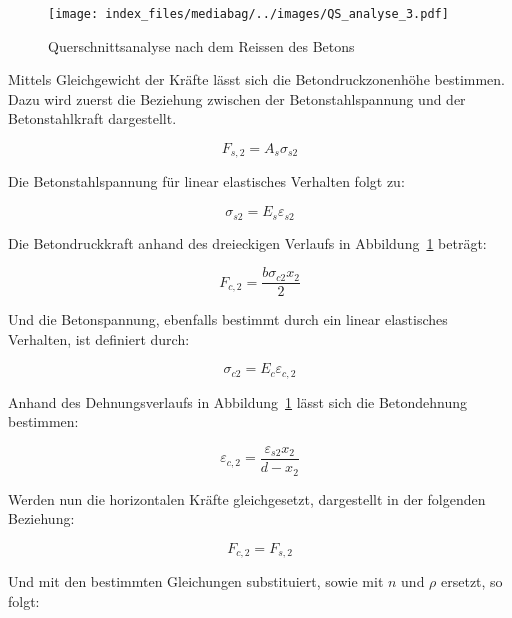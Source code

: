 \documentclass[
  12pt,
  letterpaper,
  egregdoesnotlikesansseriftitles]{scrreprt}
\begin{document}
\begin{figure}[H]

{\centering \texttt{[image: index\_files/mediabag/../images/QS\_analyse\_3.pdf]}

}

\caption{\label{fig-qs3}Querschnittsanalyse nach dem Reissen des Betons}

\end{figure}

Mittels Gleichgewicht der Kräfte lässt sich die Betondruckzonenhöhe
bestimmen. Dazu wird zuerst die Beziehung zwischen der
Betonstahlspannung und der Betonstahlkraft dargestellt.

\begin{equation}F_{s,2} = A_{s} \sigma_{s 2}\end{equation}

Die Betonstahlspannung für linear elastisches Verhalten folgt zu:

\begin{equation}\sigma_{s 2} = E_{s} \varepsilon_{s2}\end{equation}

Die Betondruckkraft anhand des dreieckigen Verlaufs in
Abbildung~\ref{fig-qs3} beträgt:

\begin{equation}F_{c,2} = \frac{b \sigma_{c 2} x_{2}}{2}\end{equation}

Und die Betonspannung, ebenfalls bestimmt durch ein linear elastisches
Verhalten, ist definiert durch:

\begin{equation}\sigma_{c 2} = E_{c} \varepsilon_{c,2}\end{equation}

Anhand des Dehnungsverlaufs in Abbildung~\ref{fig-qs3} lässt sich die
Betondehnung bestimmen:

\begin{equation}\varepsilon_{c,2} = \frac{\varepsilon_{s2} x_{2}}{d - x_{2}}\end{equation}

Werden nun die horizontalen Kräfte gleichgesetzt, dargestellt in der
folgenden Beziehung:

\begin{equation}F_{c,2} = F_{s,2}\end{equation}

Und mit den bestimmten Gleichungen substituiert, sowie mit \(n\) und
\(\rho\) ersetzt, so folgt:
\end{document}
